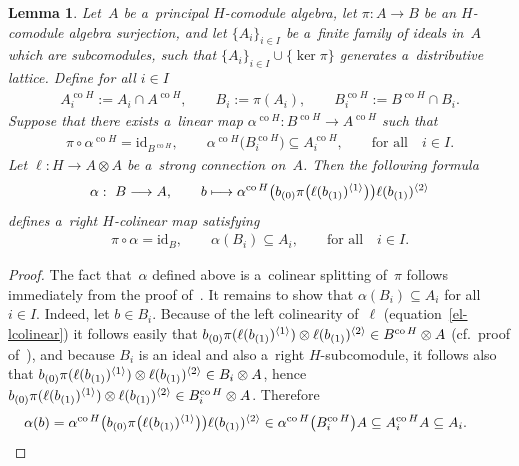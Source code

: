 \documentclass[11pt]{article}
\newtheorem{lemma}{Lemma}
\DeclareMathOperator{\co}{co}
\def\sw#1{{\sb{(#1)}}}
\newcommand{\ls}[1]{\ell(#1)^{\langle 1\rangle}}
\newcommand{\rs}[1]{\ell(#1)^{\langle 2\rangle}}
\begin{document}
\begin{lemma}
\label{alphaexists}
Let~$A$ be a~principal $H$-comodule algebra, let $\pi:A\rightarrow B$ be an $H$-comodule algebra surjection, and let
$\{A_i\}_{i\in I}$ be a~finite family of ideals in~$A$ which are subcomodules, such that $\{A_i\}_{i\in
I}\cup\{\ker\pi\}$ generates a~distributive lattice.
Define for all $i\in I$
\begin{gather*}
A_i^{\co H}:=A_i\cap A^{\co H},
\qquad
B_i:=\pi(A_i),
\qquad
B_i^{\co H}:=B^{\co H}\cap B_i.
\end{gather*}
Suppose that there exists a~linear map $\alpha^{\co H}:B^{\co H}\rightarrow A^{\co H}$ such that
\begin{gather*}
\pi\circ\alpha^{\co H}=\mathrm{id}_{B^{\co H}},
\qquad
\alpha^{\co H}\big(B^{\co H}_i\big)\subseteq A_i^{\co H},
\qquad
\text{for all}
\quad
i\in I.
\end{gather*}
Let $\ell:H\rightarrow A\otimes A$ be a~strong connection on~$A$.
Then the following formula
\begin{gather*}
\alpha: \ B\longrightarrow A,
\qquad
b\longmapsto \alpha^{\co H}\big(b\sw{0}\pi\big(\ls{b\sw{1}}\big)\big)\rs{b\sw{1}}
\end{gather*}
defines a~right $H$-colinear map satisfying
\begin{gather*}
\pi\circ\alpha=\mathrm{id}_{B},
\qquad
\alpha(B_i)\subseteq A_i,
\qquad
\text{for all}
\quad
i\in I.
\end{gather*}
\end{lemma}
\begin{proof}
The fact that~$\alpha$ def\/ined above is a~colinear splitting of~$\pi$ follows immediately from the proof of~\cite[Lemma~3.1]{hkmz11}.
It remains to show that $\alpha(B_i)\subseteq A_i$ for all $i\in I$.
Indeed, let $b\in B_i$.
Because of the left colinearity of~$\ell$ (equation~\eqref{el-lcolinear}) it follows easily that
$b\sw{0}\pi(\ls{b\sw{1}})\otimes\rs{b\sw{1}}\in B^{\co H}\otimes A$ (cf.\
proof of~\cite[Lemma~3.1]{hkmz11}), and because $B_i$ is an ideal and also a~right $H$-subcomodule, it follows also that
$b\sw{0}\pi(\ls{b\sw{1}})\otimes\rs{b\sw{1}}\in B_i\otimes A$, hence $b\sw{0}\pi(\ls{b\sw{1}})\otimes\rs{b\sw{1}}\in B^{\co H}_i\otimes A$.
Therefore
\begin{gather*}
\alpha(b)=\alpha^{\co H}\big(b\sw{0}\pi\big(\ls{b\sw{1}}\big)\big)\rs{b\sw{1}} \in \alpha^{\co H}\big(B_i^{\co
H}\big)A\subseteq A^{\co H}_iA\subseteq A_i.\tag*{\qed}
\end{gather*}
\renewcommand{\qed}{}
\end{proof}
\end{document}
